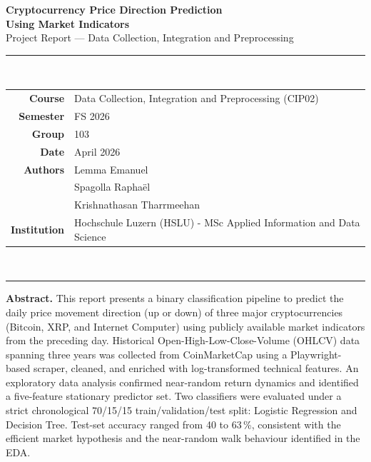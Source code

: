 \documentclass[11pt,a4paper]{article}
\begin{document}
\thispagestyle{empty}

\vspace*{2cm}
\begin{center}
  {\LARGE\bfseries\color{hslu}
    Cryptocurrency Price Direction Prediction\\[0.4em]
  Using Market Indicators}\\[0.8em]
  {\large Project Report — Data Collection, Integration and Preprocessing}\\[1.8em]

  \noindent\rule{0.6\textwidth}{0.5pt}\\[1.2em]

  \begin{tabular}{@{}rl@{}}
    \textbf{Course}    & Data Collection, Integration and Preprocessing (CIP02) \\
    \textbf{Semester}  & FS 2026 \\
    \textbf{Group}     & 103 \\
    \textbf{Date}      & April 2026 \\[0.6em]
    \textbf{Authors}
    & Lemma Emanuel \\
    & Spagolla Raphaël \\
    & Krishnathasan Tharrmeehan \\[0.6em]
    \textbf{Institution} & Hochschule Luzern (HSLU) - MSc Applied Information and Data Science \\
  \end{tabular}\\[1.8em]

  \noindent\rule{0.6\textwidth}{0.5pt}
\end{center}

\vspace{1.5cm}
\noindent\textbf{Abstract.}
This report presents a binary classification pipeline to predict the daily price movement direction (up or down) of three major cryptocurrencies (Bitcoin, XRP, and Internet Computer) using publicly available market indicators from the preceding day.
Historical Open-High-Low-Close-Volume (OHLCV) data spanning three years was collected from CoinMarketCap using a Playwright-based scraper, cleaned, and enriched with log-transformed technical features.
An exploratory data analysis confirmed near-random return dynamics and identified a five-feature stationary predictor set.
Two classifiers were evaluated under a strict chronological 70/15/15 train/validation/test split: Logistic Regression and Decision Tree.
Test-set accuracy ranged from 40 to 63\,\%, consistent with the efficient market hypothesis and the near-random walk behaviour identified in the EDA.
\end{document}
